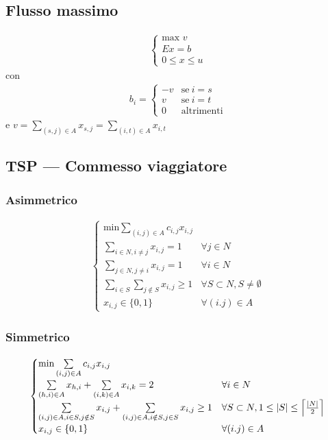 \documentclass[fleqn,12pt]{article}
\begin{document}
\subsection{Flusso massimo}
    \begin{gather*}
    \begin{cases}
        \text{max} \,\, v \\
        Ex = b \\
        0 \le x \le u
    \end{cases}
    \end{gather*}
    con
    \begin{gather*}
    b_i =
        \begin{cases}
            -v & \text{se} \> i = s \\
            v  & \text{se} \> i = t \\
            0  & \text{altrimenti}
        \end{cases}
    \end{gather*}
    e
    $v = \sum\limits_{(s,j) \in A} x_{s,j} = \sum\limits_{(i,t) \in A} x_{i,t}$
\subsection{TSP --- Commesso viaggiatore}
\subsubsection{Asimmetrico}
    \begin{gather*}
    \begin{cases}
        \text{min} \sum\limits_{(i,j) \in A} c_{i,j}x_{i,j} \\
        \sum\limits_{i \in N, i \neq j} x_{i,j} = 1 & \forall j \in N \\
        \sum\limits_{j \in N, j \neq i} x_{i,j} = 1 & \forall i \in N \\
        \sum\limits_{i \in S}\sum\limits_{j \notin S} x_{i,j} \ge 1
            & \forall S \subset N, S \neq \emptyset \\
        x_{i,j} \in \{0,1\} & \forall (i.j) \in A
    \end{cases}
    \end{gather*}
\subsubsection{Simmetrico}
    \begin{gather*}
    \begin{cases}
        \text{min} \sum\limits_{(i,j) \in A} c_{i,j}x_{i,j} \\
        \sum\limits_{(h,i) \in A} x_{h,i} +
            \sum\limits_{(i,k) \in A} x_{i,k} = 2 & \forall i \in N \\
        \sum\limits_{(i,j) \in A, i \in S, j \notin S} x_{i,j} +
            \sum\limits_{(i,j) \in A, i \notin S, j \in S} x_{i,j} \ge 1 &
            \forall S \subset N, 1 \le |S| \le
            \Big{\lceil}\frac{|N|}{2}\Big{\rceil} \\
        x_{i,j} \in \{0,1\} & \forall (i.j) \in A
    \end{cases}
    \end{gather*}
\end{document}
